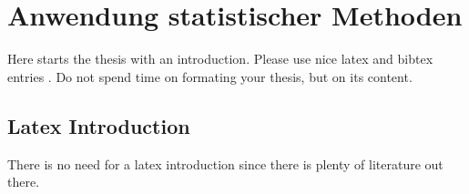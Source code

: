 \chapter{Anwendung statistischer Methoden}

Here starts the thesis with an introduction. Please use nice latex and bibtex entries \cite{latex}. Do not spend time on formating your thesis, but on its content.

\section{Latex Introduction}
There is no need for a latex introduction since there is plenty of literature out there.

